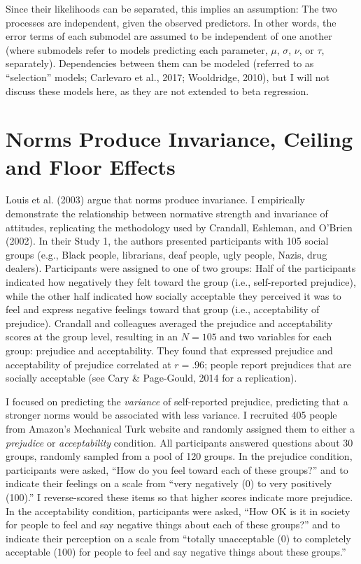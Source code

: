 \documentclass[english,,man]{apa6}
\begin{document}
Since their likelihoods can be separated, this implies an assumption: The two processes are independent, given the observed predictors. In other words, the error terms of each submodel are assumed to be independent of one another (where submodels refer to models predicting each parameter, \(\mu\), \(\sigma\), \(\nu\), or \(\tau\), separately). Dependencies between them can be modeled (referred to as ``selection'' models; Carlevaro et al., 2017; Wooldridge, 2010), but I will not discuss these models here, as they are not extended to beta regression.

\hypertarget{norms-produce-invariance-ceiling-and-floor-effects}{%
\section{Norms Produce Invariance, Ceiling and Floor Effects}\label{norms-produce-invariance-ceiling-and-floor-effects}}

Louis et al. (2003) argue that norms produce invariance. I empirically demonstrate the relationship between normative strength and invariance of attitudes, replicating the methodology used by Crandall, Eshleman, and O'Brien (2002). In their Study 1, the authors presented participants with 105 social groups (e.g., Black people, librarians, deaf people, ugly people, Nazis, drug dealers). Participants were assigned to one of two groups: Half of the participants indicated how negatively they felt toward the group (i.e., self-reported prejudice), while the other half indicated how socially acceptable they perceived it was to feel and express negative feelings toward that group (i.e., acceptability of prejudice). Crandall and colleagues averaged the prejudice and acceptability scores at the group level, resulting in an \(N = 105\) and two variables for each group: prejudice and acceptability. They found that expressed prejudice and acceptability of prejudice correlated at \(r = .96\); people report prejudices that are socially acceptable (see Cary \& Page-Gould, 2014 for a replication).

I focused on predicting the \emph{variance} of self-reported prejudice, predicting that a stronger norms would be associated with less variance. I recruited 405 people from Amazon's Mechanical Turk website and randomly assigned them to either a \emph{prejudice} or \emph{acceptability} condition. All participants answered questions about 30 groups, randomly sampled from a pool of 120 groups. In the prejudice condition, participants were asked, \enquote{How do you feel toward each of these groups?} and to indicate their feelings on a scale from \enquote{very negatively (0) to very positively (100).} I reverse-scored these items so that higher scores indicate more prejudice. In the acceptability condition, participants were asked, \enquote{How OK is it in society for people to feel and say negative things about each of these groups?} and to indicate their perception on a scale from \enquote{totally unacceptable (0) to completely acceptable (100) for people to feel and say negative things about these groups.}
\end{document}
